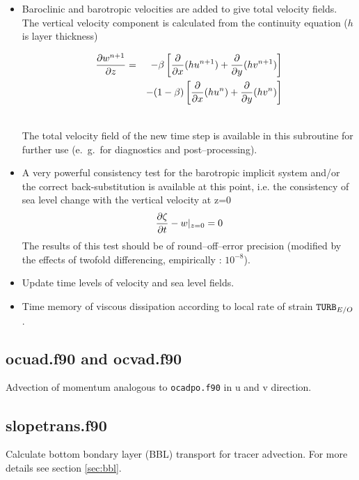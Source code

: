 \begin{itemize}
\item
Baroclinic and barotropic velocities are added to give total velocity fields.
The vertical velocity component is calculated from the continuity equation ($h$ is
layer thickness)

\parbox{13cm}{\begin{eqnarray*}
{\partial w^{n+1}\over{\partial z}}&=& -\beta\left[ {\partial\over\partial x}(hu^{n+1})
+ {\partial\over\partial y}(hv^{n+1})\right] \\
 & &-(1-\beta)\left[ {\partial\over\partial x}(hu^{n})
+ {\partial\over\partial y}(hv^{n})\right]\end{eqnarray*}}\hfill
\parbox{1cm}{\begin{eqnarray}\end{eqnarray}}

 The total velocity field of the new time step is available
in this subroutine
for further use (e.\ g.\ for diagnostics and post--processing).
\item
A very powerful consistency test for  the barotropic implicit
system and/or the correct back-substitution
 is available at this point, i.e. the consistency
of sea level change with the vertical velocity at z=0
\begin{eqnarray}
{\partial\zeta\over\partial t} - w|_{z=0} = 0
\end{eqnarray}
The results of this test should be of  round--off--error precision
(modified by the effects of twofold differencing, empirically : $10^{-8}$).

\item
Update time levels of velocity and sea level fields.

\item
Time memory of viscous dissipation according to local rate of strain ${\tt TURB}_{E/O}$.

\end{itemize}

\subsection{ocuad.f90 and ocvad.f90}
\label{ch:timestepping:ocuad}
Advection of momentum analogous to \texttt{ocadpo.f90} in u and v direction.

\subsection{slopetrans.f90}
\label{ch:timestepping:slopetrans}
Calculate bottom bondary layer (BBL) transport for tracer advection. 
For more details see section \ref{sec:bbl}.


